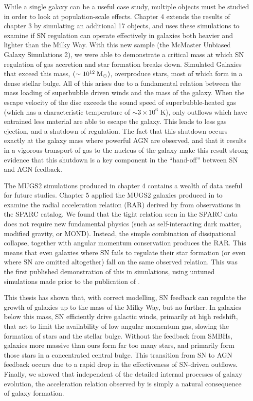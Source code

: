While a single galaxy can be a useful case study, multiple objects must be
studied in order to look at population-scale effects.  Chapter 4 extends the
results of chapter 3 by simulating an additional 17 objects, and uses these
simulations to examine if SN regulation can operate effectively in galaxies both
heavier and lighter than the Milky Way.  With this new sample (the McMaster
Unbiased Galaxy Simulations 2), we were able to demonstrate a critical mass at
which SN regulation of gas accretion and star formation breaks down.  Simulated
Galaxies that exceed this mass, $(\sim 10^{12}\>{\rm M_{\odot}})$, overproduce stars,  most
of which form in a dense stellar bulge.  All of this arises due to a fundamental
relation between the mass loading of superbubble driven winds and the mass of
the galaxy.  When the escape velocity of the disc exceeds the sound speed of
superbubble-heated gas (which has a characteristic temperature of
$\sim3\times10^6$ K), only outflows which have entrained less material are able
to escape the galaxy. This leads to less gas ejection, and a shutdown of
regulation.  The fact that this shutdown occurs exactly at the galaxy mass where
powerful AGN are observed, and that it results in a vigorous transport of gas to
the nucleus of the galaxy make this result strong evidence that this shutdown
is a key component in the ``hand-off'' between SN and AGN feedback.

The MUGS2 simulations produced in chapter 4 contains a wealth of data useful for
future studies. Chapter 5 applied the MUGS2 galaxies produced in
\citet{Keller2016a} to examine the radial acceleration relation (RAR) derived by
\citet{McGaugh2016} from observations in the SPARC \citep{Lelli2016b} catalog.
We found that the tight relation seen in the SPARC data does not require new
fundamental physics (such as self-interacting dark matter, modified gravity, or
MOND).  Instead, the simple combination of dissipational collapse, together with
angular momentum conservation produces the RAR. This means that even galaxies
where SN fails to regulate their star formation (or even where SN are omitted
altogether) fall on the same observed relation.  This was the first published
demonstration of this in simulations, using untuned simulations made prior to
the publication of \citet{McGaugh2016}.

This thesis has shown that, with correct modelling, SN feedback can regulate the
growth of galaxies up to the mass of the Milky Way, but no further.  In galaxies
below this mass, SN efficiently drive galactic winds, primarily at
high redshift, that act to limit the availability of low angular momentum gas,
slowing the formation of stars and the stellar bulge. Without the
feedback from SMBHs, galaxies more massive than ours form far too many stars,
and primarily form those stars in a concentrated central bulge.  This transition
from SN to AGN feedback occurs due to a rapid drop in the effectiveness of
SN-driven outflows.  Finally, we showed that independent of the detailed
internal processes of galaxy evolution, the acceleration relation observed by
\citet{McGaugh2016} is simply a natural consequence of galaxy formation.

